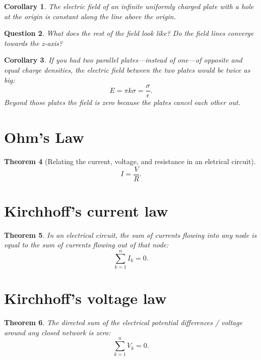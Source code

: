 \documentclass[12pt]{article}
\theoremstyle{plain}
\newtheorem{theorem}{Theorem}
\newtheorem{corollary}[theorem]{Corollary}
\newtheorem{question}[theorem]{Question}
\theoremstyle{definition}
\theoremstyle{remark}
\begin{document}
\begin{corollary}
The electric field of an infinite uniformly charged plate with a hole at the origin is constant along the line above the origin.
\end{corollary}

\begin{question}
What does the rest of the field look like? Do the field lines converge towards the z-axis?
\end{question}

\begin{corollary}
If you had two parallel plates---instead of one---of opposite and equal charge densities, the electric field between the two plates would be twice as big: $$E = \pi k \sigma = \frac{\sigma}{\epsilon}.$$ Beyond those plates the field is zero because the plates cancel each other out.
\end{corollary}

\section{Ohm's Law}

\begin{theorem}[Relating the current, voltage, and resistance in an eletrical
circuit]
\[
  I = \frac { V } { R }.
\]
\end{theorem}

\section{Kirchhoff's current law}

\begin{theorem}
  In an electrical circuit, the sum of currents flowing into any node is equal
  to the sum of currents flowing out of that node:
  \[
  \sum _ { k = 1 } ^ { n } I _ { k } = 0.
  \]
\end{theorem}

\section{Kirchhoff's voltage law}

\begin{theorem}
  The directed sum of the electrical potential differences / voltage around any
closed network is zero:
\[
\sum _ { k = 1 } ^ { n } V _ { k } = 0.
\]
\end{theorem}
\end{document}
